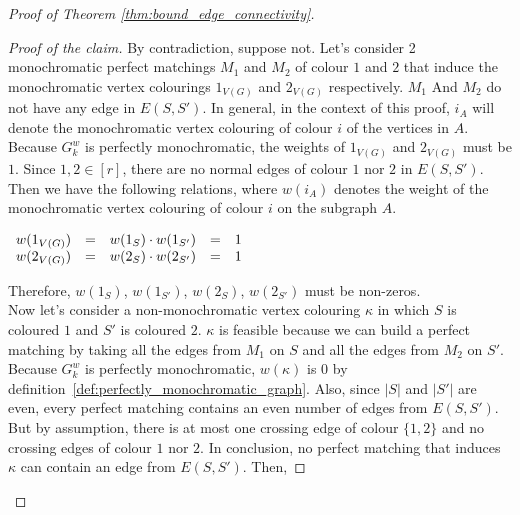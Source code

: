 \begin{proof}[Proof of Theorem \ref{thm:bound_edge_connectivity}]
\begin{enumerate}
\begin{enumerate}
                    \begin{proof}[Proof of the claim]
                        By contradiction, suppose not.
                        Let's consider 2 monochromatic perfect matchings $M_1$ and $M_2$ of colour $1$ and $2$ that induce the monochromatic vertex colourings $1_{V(G)}$ and $2_{V(G)}$ respectively.
                        $M_1$ And $M_2$ do not have any edge in $E(S, S')$.
                        In general, in the context of this proof, $i_A$ will denote the monochromatic vertex colouring of colour $i$ of the vertices in $A$.
                        Because $G_k^w$ is perfectly monochromatic, the weights of $1_{V(G)}$ and $2_{V(G)}$ must be $1$.
                        Since $1, 2 \in [r]$, there are no normal edges of colour $1$ nor $2$ in $E(S, S')$.
                        Then we have the following relations, where $w(i_A)$ denotes the weight of the monochromatic vertex colouring of colour $i$ on the subgraph $A$.
                        
                        \begin{center}
                            $\begin{array}{l c l c l}
                                w(1_{V(G)}) & = & w(1_S) \cdot w(1_{S'}) & = & 1 \\
                                w(2_{V(G)}) & = & w(2_S) \cdot w(2_{S'}) & = & 1
                            \end{array}$
                        \end{center}
                        
                        Therefore, $w(1_S)$, $w(1_{S'})$, $w(2_S)$, $w(2_{S'})$ must be non-zeros. \\

                        Now let's consider a non-monochromatic vertex colouring $\kappa$ in which $S$ is coloured $1$ and $S'$ is coloured $2$.
                        $\kappa$ is feasible because we can build a perfect matching by taking all the edges from $M_1$ on $S$ and all the edges from $M_2$ on $S'$.
                        Because $G_k^w$ is perfectly monochromatic, $w(\kappa)$ is 0 by definition~\ref{def:perfectly_monochromatic_graph}.
                        Also, since $|S|$ and $|S'|$ are even, every perfect matching contains an even number of edges from $E(S, S')$.
                        But by assumption, there is at most one crossing edge of colour $\{1, 2\}$ and no crossing edges of colour $1$ nor $2$.
                        In conclusion, no perfect matching that induces $\kappa$ can contain an edge from $E(S, S')$.
                        Then,
                        

\end{proof}
\end{enumerate}
\end{enumerate}
\end{proof}
